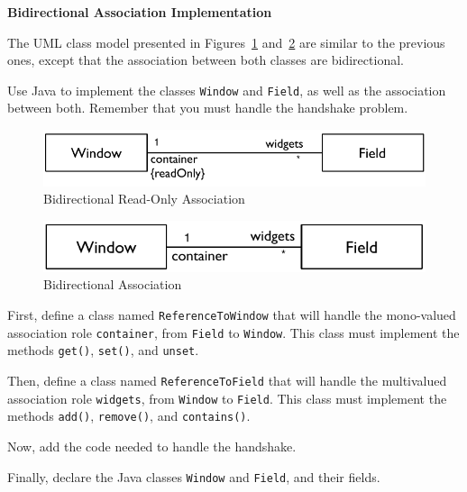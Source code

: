 \documentclass[a4paper,11pt]{memoir}
\newcommand{\code}[1]{\lstinline{#1}}
\begin{document}
\begin{question}
	\textbf{Bidirectional Association Implementation}

The UML class model presented in Figures~\ref{fig:readOnly} and~\ref{fig:bidirectional}
are similar to the previous ones, except that the association between both classes are bidirectional.

Use Java to implement the classes \code{Window} and \code{Field}, as well as the association between both.
Remember that you must handle the handshake problem.

\begin{figure}[htbp]
	\centering
		\includegraphics[scale=.8]{CD-WindowFieldReadOnly.pdf}
	\caption{Bidirectional Read-Only Association}
	\label{fig:readOnly}
\end{figure}

\begin{figure}[htbp]
	\centering
		\includegraphics[scale=.8]{CD-WindowField.pdf}
	\caption{Bidirectional Association}
	\label{fig:bidirectional}
\end{figure}	


\begin{inparaenum}[(A)]
	\item First, define a class named \code{ReferenceToWindow} that will handle the mono-valued association role \code{container}, from \code{Field} to \code{Window}. This class must implement the methods \code{get()}, \code{set()}, and \code{unset}.
	\item Then, define a class named \code{ReferenceToField} that will handle the multivalued association role \code{widgets}, from \code{Window} to \code{Field}. This class must implement the methods \code{add()}, \code{remove()}, and \code{contains()}.
	\item Now, add the code needed to handle the handshake. 
	\item Finally, declare the Java classes \code{Window} and \code {Field}, and their fields.
\end{inparaenum}
	
\end{question}
\end{document}
